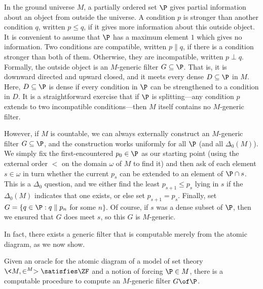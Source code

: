 \documentclass{amsart}
\begin{document}
 In the ground universe $M$, a partially ordered set $\P$ gives partial information about an object from outside the universe.  A condition $p$ is stronger than another condition $q$, written $p \le q$, if it gives more information about this outside object. It is convenient to assume that $\P$ has a maximum element $1$ which gives no information.
 Two conditions are compatible, written $p \parallel q$, if there is a condition stronger than both of them. Otherwise, they are incompatible, written $p \perp q$. Formally, the outside object is an $M$-generic filter $G \subseteq \P$. That is, it  is downward directed and upward closed, and it meets every dense $D \subseteq \P$ in $M$. Here, $D \subseteq \P$ is dense if every condition in $\P$ can be strengthened to a condition in $D$. It is a straightforward exercise that if $\P$ is
 splitting---any condition $p$ extends to two incompatible conditions---then $M$ itself contains no $M$-generic filter.
 
 However, if $M$ is countable, we can always externally construct an $M$-generic filter $G \subseteq \P$,
 and the construction works uniformly for all $\P$ (and all $\Delta_0(M)$).  We simply fix the first-encountered $p_0\in\P$
 as our starting point (using the external order $<$ on the domain $\omega$ of $M$ to find it)
 and then ask of each element $s\in\omega$ in turn whether the current $p_s$ can be extended to an
 element of $\P\cap s$.  This is a $\Delta_0$ question, and we either find the least $p_{s+1}\leq p_s$
 lying in $s$ if the $\Delta_0(M)$ indicates that one exists, or else set $p_{s+1}=p_s$.
 Finally, set $G = \{ q \in \P : q \parallel p_n$ for some $n\}$.  Of course, if $s$ was a dense
 subset of $\P$, then we ensured that $G$ does meet $s$, so this $G$ is $M$-generic.
 
 
 In fact, there exists a generic filter that is computable merely from the atomic diagram, as we now  show.
 
 \begin{theorem}\label{Theorem.Computing-generic-filter}
 Given an oracle for the atomic diagram of a model of set theory $\<M,\in^M>\satisfies\ZF$ and a notion of forcing $\P\in M$, there is a computable procedure to compute an $M$-generic filter $G\of\P$.
 \end{theorem}
 
\end{document}
